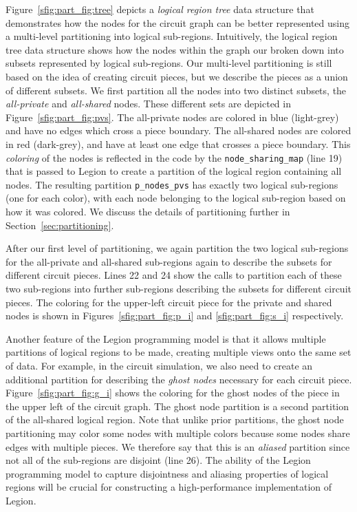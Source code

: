 Figure~\ref{sfig:part_fig:tree} depicts a {\em logical
region tree} data structure that demonstrates how
the nodes for the circuit graph can be better represented
using a multi-level partitioning into logical sub-regions. 
Intuitively, the logical region tree data structure
shows how the nodes within the graph our broken down
into subsets represented by logical sub-regions.
Our multi-level partitioning is still based on the 
idea of creating circuit pieces, but we describe the
pieces as a union of different subsets. We first partition
all the nodes into two distinct subsets, the 
{\em all-private} and {\em all-shared} nodes. These 
different sets are depicted in Figure~\ref{sfig:part_fig:pvs}.
The all-private nodes are colored in blue (light-grey)
and have no edges which cross a piece boundary. The
all-shared nodes are colored in red (dark-grey), and
have at least one edge that crosses a piece boundary.
This {\em coloring} of the nodes is reflected in the
code by the {\tt node\_sharing\_map} (line 19) that
is passed to Legion to create a partition of the 
logical region containing all nodes. The resulting 
partition {\tt p\_nodes\_pvs} has exactly two logical
sub-regions (one for each color), with each node
belonging to the logical sub-region based on how it
was colored. We discuss the details of partitioning
further in Section~\ref{sec:partitioning}.

After our first level of partitioning, we again
partition the two logical sub-regions for the all-private
and all-shared sub-regions again to describe the
subsets for different circuit pieces. Lines 22 and 24
show the calls to partition each of these two sub-regions
into further sub-regions describing the subsets for
different circuit pieces. The coloring for the upper-left
circuit piece for the private and shared nodes is
shown in Figures~\ref{sfig:part_fig:p_i} and 
\ref{sfig:part_fig:s_i} respectively. 

Another feature of the Legion programming model is 
that it allows multiple partitions of logical regions 
to be made, creating multiple views onto the same set 
of data. For example, in the circuit simulation, we also 
need to create an additional partition for describing 
the {\em ghost nodes} necessary for each circuit piece. 
Figure~\ref{sfig:part_fig:g_i} shows the coloring for 
the ghost nodes of the piece in the upper left of the 
circuit graph. The ghost node partition is a second 
partition of the all-shared logical region. Note that
unlike prior partitions, the ghost node partitioning
may color some nodes with multiple colors because
some nodes share edges with multiple pieces. We therefore
say that this is an {\em aliased} partition since not all
of the sub-regions are disjoint (line 26). The ability
of the Legion programming model to capture disjointness
and aliasing properties of logical regions will be
crucial for constructing a high-performance implementation
of Legion.

